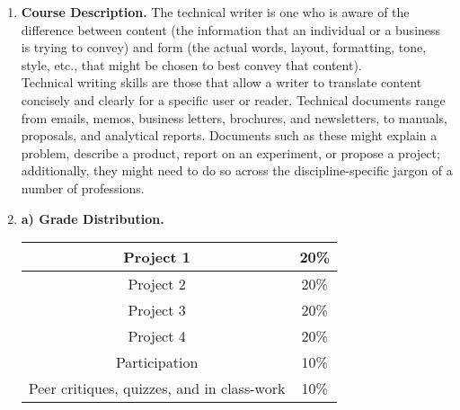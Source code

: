 \documentclass[9pt]{article}
\begin{document}
\begin{enumerate}
   \item \textbf{Course Description.} The technical writer is one who is aware
         of the difference between content (the information that an individual
         or a business is trying to convey) and form (the actual words, layout,
         formatting, tone, style, etc., that might be chosen to best convey that
         content). \\
         
         Technical writing skills are those that allow a writer to translate
         content concisely and clearly for a specific user or reader. Technical
         documents range from emails, memos, business letters, brochures, and
         newsletters, to manuals, proposals, and analytical reports. Documents
         such as these might explain a problem, describe a product, report on
         an experiment, or propose a project; additionally, they might need to
         do so across the discipline-specific jargon of a number of professions.
         
   \item \textbf{a) Grade Distribution.} 
         \begin{center}
            \begin{tabular}{@{}|c|c|@{}}
               \hline Project 1 & 20\% \\ \hline
               Project 2 & 20\% \\ \hline
               Project 3 & 20\% \\ \hline
               Project 4 & 20\% \\ \hline
               Participation & 10\% \\ \hline
               Peer critiques, quizzes, and in class-work & 10\% \\ \hline
            \end{tabular}
         \end{center}
         

\end{enumerate}
\end{document}
